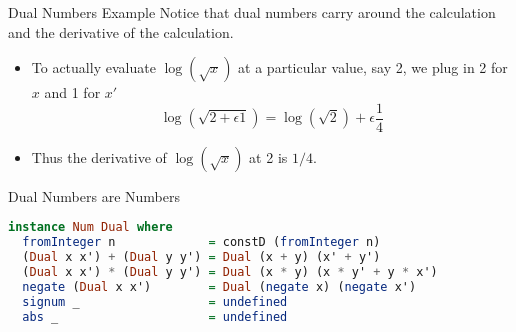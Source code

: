 \documentclass{beamer}
\begin{document}
\begin{frame}[fragile]{Dual Numbers Example}
Notice that dual numbers carry around the calculation and the
derivative of the calculation.

\begin{itemize}
\item
To actually evaluate $\log(\sqrt{x})$
at a particular value, say 2, we plug in 2 for $x$ and 1 for $x'$
$$
\log (\sqrt{2 + \epsilon 1}) = \log(\sqrt{2}) + \epsilon\frac{1}{4}
$$
\item
Thus the derivative of $\log(\sqrt{x})$ at 2 is $1/4$.
\end{itemize}
\end{frame}

\begin{frame}[fragile]{Dual Numbers are Numbers}
\begin{scriptsize}
\begin{lstlisting}[language=Haskell]
instance Num Dual where
  fromInteger n             = constD (fromInteger n)
  (Dual x x') + (Dual y y') = Dual (x + y) (x' + y')
  (Dual x x') * (Dual y y') = Dual (x * y) (x * y' + y * x')
  negate (Dual x x')        = Dual (negate x) (negate x')
  signum _                  = undefined
  abs _                     = undefined
\end{lstlisting}
\end{scriptsize}
\end{frame}
\end{document}
